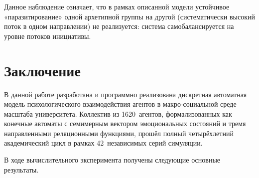 \documentclass[12pt]{article}
\begin{document}
Данное наблюдение означает, что в рамках описанной модели
устойчивое «паразитирование» одной архетипной группы на другой
(систематически высокий поток в одном направлении) не
реализуется: система самобалансируется на уровне потоков инициативы.

\clearpage
\section{Заключение}

В данной работе разработана и программно реализована дискретная
автоматная модель психологического взаимодействия агентов в
макро-социальной среде масштаба университета.
Коллектив из 1620~агентов, формализованных как конечные автоматы
с семимерным вектором эмоциональных состояний и тремя направленными
реляционными функциями, прошёл полный четырёхлетний академический
цикл в рамках 42~независимых серий симуляции.

В ходе вычислительного эксперимента получены следующие основные
результаты.
\end{document}
